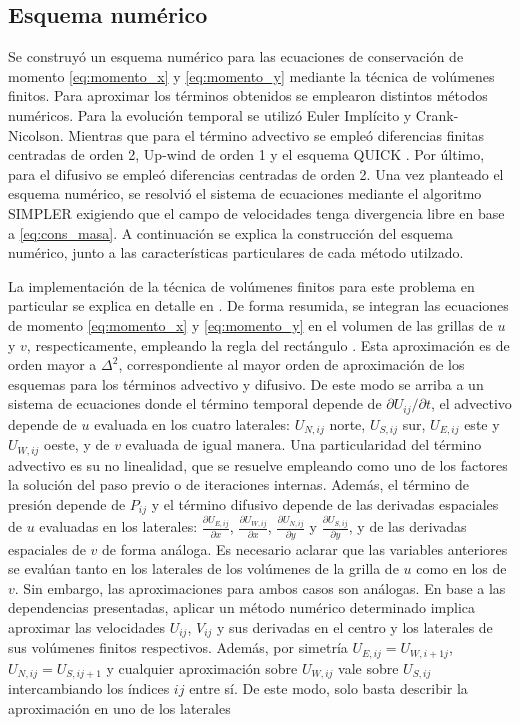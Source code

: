 \documentclass[aps,prb,twocolumn,superscriptaddress,floatfix,longbibliography,10pt]{revtex4-2}
\newif\ifptitle
\newif\ifpnumber
\newcounter{para}
\newcommand\ptitle[1]{\par\refstepcounter{para}
{\ifpnumber{\noindent\textcolor{lightgray}{\textbf{\thepara}}\indent}\fi}
{\ifptitle{\textbf{[{#1}]}}\fi}}
\begin{document}
\subsection{Esquema numérico}

\ptitle{Resumen}
Se construyó un esquema numérico para las ecuaciones de conservación de momento \ref{eq:momento_x} y \ref{eq:momento_y} mediante la técnica de volúmenes finitos. Para aproximar los términos obtenidos se emplearon distintos métodos numéricos. Para la evolución temporal se utilizó Euler Implícito y Crank-Nicolson. Mientras que para el término advectivo se empleó diferencias finitas centradas de orden 2, Up-wind de orden 1 y el esquema QUICK \cite{Hayase1992}. Por último, para el difusivo se empleó diferencias centradas de orden 2. Una vez planteado el esquema numérico, se resolvió el sistema de ecuaciones mediante el algoritmo SIMPLER exigiendo que el campo de velocidades tenga divergencia libre en base a \ref{eq:cons_masa}. A continuación se explica la construcción del esquema numérico, junto a las características particulares de cada método utilzado.

\ptitle{Volúmenes finitos}
La implementación de la técnica de volúmenes finitos para este problema en particular se explica en detalle en \cite{Notas_materia}. De forma resumida, se integran las ecuaciones de momento \ref{eq:momento_x} y \ref{eq:momento_y} en el volumen de las grillas de $u$ y $v$, respecticamente, empleando la regla del rectángulo \cite{Moin}. Esta aproximación es de orden mayor a $\Delta^2$, correspondiente al mayor orden de aproximación de los esquemas para los términos advectivo y difusivo. De este modo se arriba a un sistema de ecuaciones donde el término temporal depende de $\partial U_{ij}/ \partial t$, el advectivo depende de $u$ evaluada en los cuatro laterales: $U_{N,ij}$ norte, $U_{S,ij}$ sur, $U_{E,ij}$ este y $U_{W,ij}$ oeste, y de $v$ evaluada de igual manera. Una particularidad del término advectivo es su no linealidad, que se resuelve empleando como uno de los factores la solución del paso previo o de iteraciones internas. Además, el término de presión depende de $P_{ij}$ y el término difusivo depende de las derivadas espaciales de $u$ evaluadas en los laterales: $\frac{\partial U_{E,ij}}{\partial x}$, $\frac{\partial U_{W,ij}}{\partial x}$, $\frac{\partial U_{N,ij}}{\partial y}$ y $\frac{\partial U_{S,ij}}{\partial y}$, y de las derivadas espaciales de $v$ de forma análoga. Es necesario aclarar que las variables anteriores se evalúan tanto en los laterales de los volúmenes de la grilla de $u$ como en los de $v$. Sin embargo, las aproximaciones para ambos casos son análogas. En base a las dependencias presentadas, aplicar un método numérico determinado implica aproximar las velocidades $U_{ij}$, $V_{ij}$ y sus derivadas en el centro y los laterales de sus volúmenes finitos respectivos. Además, por simetría $U_{E,ij} = U_{W,i+1j}$, $U_{N,ij} = U_{S,ij+1}$ y cualquier aproximación sobre $U_{W,ij}$ vale sobre $U_{S,ij}$ intercambiando los índices $ij$ entre sí. De este modo, solo basta describir la aproximación en uno de los laterales
\end{document}
